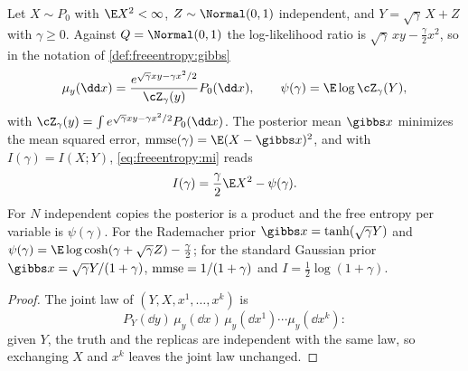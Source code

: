 \begin{refsection}
Let $X\sim P_0$ with $\E X^2<\infty$, $Z\sim\Normal(0,1)$ independent, and $Y=\sqrt\gamma\,X+Z$ with $\gamma\ge0$. Against $Q=\Normal(0,1)$ the log-likelihood ratio is $\sqrt\gamma\,xy-\frac\gamma2x^2$, so in the notation of \cref{def:freeentropy:gibbs}
\[
\mu_y(\dd x)=\frac{e^{\sqrt\gamma xy-\gamma x^2/2}}{\cZ_\gamma(y)}P_0(\dd x),\qquad\psi(\gamma)=\E\log\cZ_\gamma(Y),
\]
with $\cZ_\gamma(y)=\int e^{\sqrt\gamma xy-\gamma x^2/2}P_0(\dd x)$. The posterior mean $\gibbs x$ minimizes the mean squared error, $\freeentropymmse(\gamma)=\E(X-\gibbs x)^2$, and with $I(\gamma)=I(X;Y)$, \eqref{eq:freeentropy:mi} reads
\begin{equation}\label{eq:freeentropy:scalarmi}
I(\gamma)=\frac\gamma2\E X^2-\psi(\gamma).
\end{equation}
For $N$ independent copies the posterior is a product and the free entropy per variable is $\psi(\gamma)$. For the Rademacher prior $\gibbs x=\tanh(\sqrt\gamma Y)$ and $\psi(\gamma)=\E\log\cosh(\gamma+\sqrt\gamma Z)-\frac\gamma2$; for the standard Gaussian prior $\gibbs x=\sqrt\gamma Y/(1+\gamma)$, $\mathrm{mmse}=1/(1+\gamma)$ and $I=\frac12\log(1+\gamma)$.


\begin{proof}
The joint law of $(Y,X,x^1,\dots,x^k)$ is
\[
P_Y(\dd y)\,\mu_y(\dd x)\,\mu_y(\dd x^1)\cdots\mu_y(\dd x^k):
\]
given $Y$, the truth and the replicas are independent with the same law, so exchanging $X$ and $x^k$ leaves the joint law unchanged.
\end{proof}



\end{refsection}
